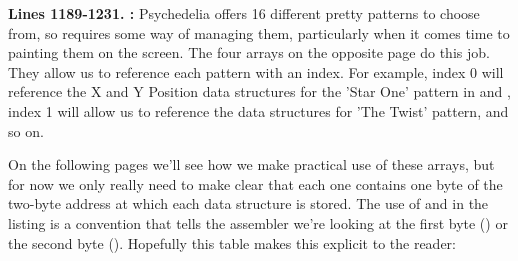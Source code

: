 \textbf{Lines 1189-1231. :} Psychedelia
offers 16 different pretty patterns to choose from, so requires some way of managing them, particularly
when it comes time to painting them on the screen. The four arrays on the opposite page do this job.
They allow us to reference each pattern with an index. For example, index 0 will reference the X and
Y Position data structures for the 'Star One' pattern in  and 
, index 1 will allow us to reference the data structures for 'The Twist' pattern,
and so on.

On the following pages we'll see how we make practical use of these arrays, but for now we only really
need to make clear that each one contains one byte of the two-byte address at which each
data structure is stored. The use of \icode{<} and \icode{>} in the listing is a convention that
tells the assembler we're looking at the first byte (\icode{>}) or the second byte (\icode{<}).
Hopefully this table makes this explicit to the reader:

